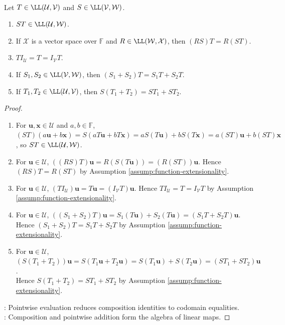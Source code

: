 \begin{proposition} \label{prop:linear-map-product-algebra} \\
Let $T\in\LL(\mathcal{U},\mathcal{V})$ and $S\in\LL(\mathcal{V},\mathcal{W})$.
\begin{enumerate}[label=(\roman*)]
\setlength{\itemsep}{0pt}
\item $ST\in\LL(\mathcal{U},\mathcal{W})$.
\item If $\mathcal{X}$ is a vector space over $\mathbb{F}$ and $R\in\LL(\mathcal{W},\mathcal{X})$, then $(RS)T=R(ST)$.
\item $TI_{\mathcal{U}}=T=I_{\mathcal{V}}T$.
\item If $S_1,S_2\in\LL(\mathcal{V},\mathcal{W})$, then $(S_1+S_2)T=S_1T+S_2T$.
\item If $T_1,T_2\in\LL(\mathcal{U},\mathcal{V})$, then $S(T_1+T_2)=ST_1+ST_2$.
\end{enumerate}
\begin{proof}
\begin{enumerate}[label=(\roman*)]
\setlength{\itemsep}{0pt}
\item For $\mathbf{u},\mathbf{x}\in\mathcal{U}$ and $a,b\in\mathbb{F}$, $(ST)(a\mathbf{u}+b\mathbf{x})=S(aT\mathbf{u}+bT\mathbf{x})=aS(T\mathbf{u})+bS(T\mathbf{x})=a(ST)\mathbf{u}+b(ST)\mathbf{x}$, so $ST\in\LL(\mathcal{U},\mathcal{W})$.
\item For $\mathbf{u}\in\mathcal{U}$, $((RS)T)\mathbf{u}=R(S(T\mathbf{u}))=(R(ST))\mathbf{u}$. Hence $(RS)T=R(ST)$ by Assumption \ref{assump:function-extensionality}.
\item For $\mathbf{u}\in\mathcal{U}$, $(TI_{\mathcal{U}})\mathbf{u}=T\mathbf{u}=(I_{\mathcal{V}}T)\mathbf{u}$. Hence $TI_{\mathcal{U}}=T=I_{\mathcal{V}}T$ by Assumption \ref{assump:function-extensionality}.
\item For $\mathbf{u}\in\mathcal{U}$, $((S_1+S_2)T)\mathbf{u}=S_1(T\mathbf{u})+S_2(T\mathbf{u})=(S_1T+S_2T)\mathbf{u}$. Hence $(S_1+S_2)T=S_1T+S_2T$ by Assumption \ref{assump:function-extensionality}.
\item For $\mathbf{u}\in\mathcal{U}$, $(S(T_1+T_2))\mathbf{u}=S(T_1\mathbf{u}+T_2\mathbf{u})=S(T_1\mathbf{u})+S(T_2\mathbf{u})=(ST_1+ST_2)\mathbf{u}$.\\
Hence $S(T_1+T_2)=ST_1+ST_2$ by Assumption \ref{assump:function-extensionality}.
\end{enumerate}
: Pointwise evaluation reduces composition identities to codomain equalities.\\
: Composition and pointwise addition form the algebra of linear maps.
\end{proof}
\end{proposition}

